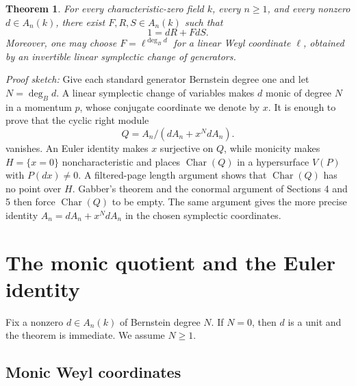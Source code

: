 \documentclass[11pt]{amsart}
\newtheorem{theorem}{Theorem}[section]
\theoremstyle{definition}
\newcommand{\CharVar}{\operatorname{Char}}
\begin{document}
\begin{theorem}\label{thm:main}
For every characteristic-zero field $k$, every $n\geq 1$, and every nonzero
$d\in A_n(k)$, there exist $F,R,S\in A_n(k)$ such that
\[
 1=dR+FdS.
\]
Moreover, one may choose $F=\ell^{\deg_B d}$ for a linear Weyl coordinate
$\ell$, obtained by an invertible linear symplectic change of generators.
\end{theorem}
\textit{Proof sketch:}
Give each standard generator Bernstein degree one and
let $N=\deg_B d$.  A linear symplectic change of variables makes $d$ monic of
degree $N$ in a momentum $p$, whose conjugate coordinate we denote by $x$.  It is
enough to prove that the cyclic right module
\[
 Q=A_n/(dA_n+x^NdA_n).
 \tag{1.2}\label{eq:Q-intro}
\]
vanishes.  An Euler identity makes $x$ surjective on $Q$, while monicity makes
$H=\{x=0\}$ noncharacteristic and places $\CharVar(Q)$ in a hypersurface
$V(P)$ with $P(dx)\ne0$.  A filtered-page length argument shows that
$\CharVar(Q)$ has no point over $H$.  Gabber's theorem and the conormal
argument of Sections 4 and 5 then force $\CharVar(Q)$ to be empty.  The same
argument gives the more precise identity $A_n=dA_n+x^NdA_n$ in the chosen
symplectic coordinates.

\section{The monic quotient and the Euler identity}

Fix a nonzero $d\in A_n(k)$ of Bernstein degree $N$. If $N=0$, then $d$ is a
unit and the theorem is immediate. We assume $N\geq1$.

\subsection{Monic Weyl coordinates}
\end{document}
